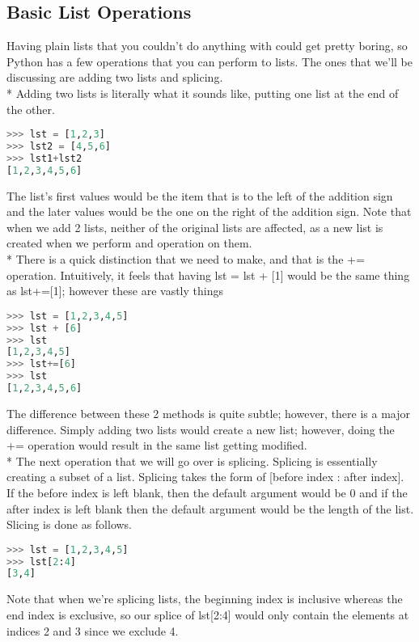 \documentclass{article}
\begin{document}
\subsection{Basic List Operations}
Having plain lists that you couldn't do anything with could get pretty boring, so Python has a few operations that you can perform to lists. The ones that we'll be discussing are adding two lists and splicing. \\*
\bigskip
Adding two lists is literally what it sounds like, putting one list at the end of the other. 
\begin{lstlisting}[language = Python]
>>> lst = [1,2,3]
>>> lst2 = [4,5,6]
>>> lst1+lst2
[1,2,3,4,5,6]
\end{lstlisting}
The list's first values would be the item that is to the left of the addition sign and the later values would be the one on the right of the addition sign. Note that when we add 2 lists, neither of the original lists are affected, as a new list is created when we perform and operation on them.\\*
\bigskip
There is a quick distinction that we need to make, and that is the += operation. Intuitively, it feels that having lst = lst + [1] would be the same thing as lst+=[1]; however these are vastly things 
 \begin{lstlisting}[language = Python]
>>> lst = [1,2,3,4,5] 
>>> lst + [6]
>>> lst
[1,2,3,4,5]
>>> lst+=[6]
>>> lst
[1,2,3,4,5,6]
\end{lstlisting}
The difference between these 2 methods is quite subtle; however, there is a major difference. Simply adding two lists would create a new list; however, doing the += operation would result in the same list getting modified.  \\*
\bigskip
The next  operation that we will go over is splicing. Splicing is essentially creating a subset of a list. Splicing takes the form of [before index : after index]. If the before index is left blank, then the default argument would be 0 and if the after index is left blank then the default argument would be the length of the list. Slicing is done as follows.
\begin{lstlisting}[language = Python]
>>> lst = [1,2,3,4,5]
>>> lst[2:4]
[3,4]
\end{lstlisting}
 Note that when we're splicing lists, the beginning index is inclusive whereas the end index is exclusive, so our splice of lst[2:4] would only contain the elements at indices 2 and 3 since we exclude 4. 
\end{document}
